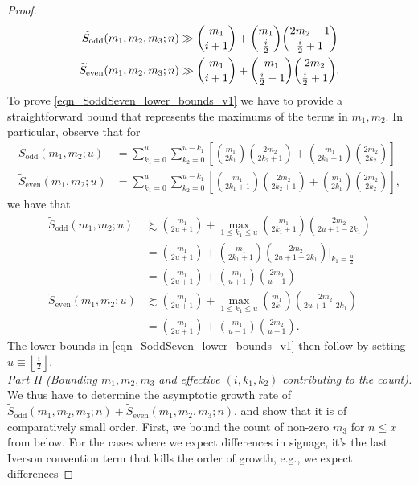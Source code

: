 \documentclass[11pt,reqno,a4letter]{article}
\numberwithin{figure}{section}
\numberwithin{table}{section}
\newcommand{\Floor}[2]{\ensuremath{\left\lfloor \frac{#1}{#2} \right\rfloor}}
\theoremstyle{plain}
\numberwithin{theorem}{section}
\theoremstyle{definition}
\begin{document}
\begin{proof}
\begin{align}
\label{eqn_SoddSeven_lower_bounds_v1} 
\widetilde{S}_{\operatorname{odd}}(m_1, m_2, m_3; n) & \gg 
     \binom{m_1}{i+1} + \binom{m_1}{\frac{i}{2}} \binom{2m_2-1}{\frac{i}{2}+1} \\ 
\notag 
\widetilde{S}_{\operatorname{even}}(m_1, m_2, m_3; n) & \gg 
     \binom{m_1}{i+1} + \binom{m_1}{\frac{i}{2}-1} \binom{2m_2}{\frac{i}{2}+1}. 
\end{align} 
To prove \eqref{eqn_SoddSeven_lower_bounds_v1} we have to provide a straightforward bound that 
represents the maximums of the terms in $m_1,m_2$. In particular, observe that for 
\begin{align*} 
\widetilde{S}_{\operatorname{odd}}(m_1, m_2; u) & = 
     \sum_{k_1=0}^{u} \sum_{k_2=0}^{u-k_1} \left[\binom{m_1}{2k_1} \binom{2m_2}{2k_2+1} + 
     \binom{m_1}{2k_1+1} \binom{2m_2}{2k_2}\right] \\ 
\widetilde{S}_{\operatorname{even}}(m_1, m_2; u) & = 
     \sum_{k_1=0}^{u} \sum_{k_2=0}^{u-k_1} \left[\binom{m_1}{2k_1+1} \binom{2m_2}{2k_2+1} + 
     \binom{m_1}{2k_1} \binom{2m_2}{2k_2}\right], 
\end{align*} 
we have that 
\begin{align*} 
\widetilde{S}_{\operatorname{odd}}(m_1, m_2; u) & \succsim \binom{m_1}{2u+1} + 
     \max_{1 \leq k_1 \leq u} \binom{m_1}{2k_1+1} \binom{2m_2}{2u+1-2k_1} \\ 
     & = \binom{m_1}{2u+1} + \binom{m_1}{2k_1+1} \binom{2m_2}{2u+1-2k_1} \Biggr\rvert_{k_1=\frac{u}{2}} \\ 
     & =  \binom{m_1}{2u+1} + \binom{m_1}{u+1} \binom{2m_2}{u+1} \\ 
\widetilde{S}_{\operatorname{even}}(m_1, m_2; u) & \succsim \binom{m_1}{2u+1} + 
     \max_{1 \leq k_1 \leq u} \binom{m_1}{2k_1} \binom{2m_2}{2u+1-2k_1} \\ 
     & = \binom{m_1}{2u+1} + \binom{m_1}{u-1} \binom{2m_2}{u+1}.  
\end{align*} 
The lower bounds in \eqref{eqn_SoddSeven_lower_bounds_v1} then follow by setting 
$u \equiv \Floor{i}{2}$. \\ 
\textit{Part II (Bounding $m_1,m_2,m_3$ and effective $(i, k_1, k_2)$ contributing to the count). } 
We thus have to determine the asymptotic growth rate of 
$\widetilde{S}_{\operatorname{odd}}(m_1, m_2, m_3; n) + \widetilde{S}_{\operatorname{even}}(m_1, m_2, m_3; n)$, 
and show that it is of comparatively small order. First, we bound the count of non-zero $m_3$ for 
$n \leq x$ from below. 
For the cases where we expect differences in 
signage, it's the last Iverson convention term that kills the order of growth, e.g., we expect differences 

\end{proof}
\end{document}
